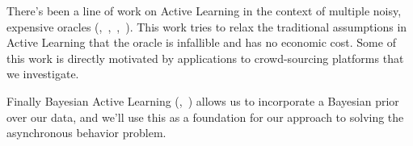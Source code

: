 There's been a line of work on Active Learning in the context of multiple noisy, expensive oracles (\cite{yan2011active},~\cite{donmez2008proactive},~\cite{golovin2010near},~\cite{vijayanarasimhan2014large}).
This work tries to relax the traditional assumptions in Active Learning that the oracle is infallible and has no economic cost.
Some of this work is directly motivated by applications to crowd-sourcing platforms that we investigate.


Finally Bayesian Active Learning (\cite{golovin2010near},~\cite{tong2000active}) allows us to incorporate a Bayesian prior over our data, and we'll use this as a foundation for our approach to solving the asynchronous behavior problem.

